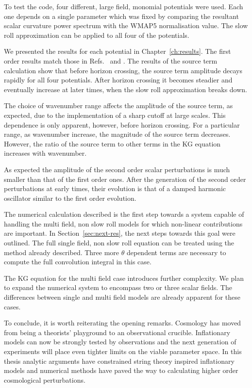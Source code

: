 To test the code, four different, large field, monomial potentials were used. Each
one depends on a single parameter which was fixed by comparing the resultant scalar
curvature power spectrum with the WMAP5 normalisation value. The slow roll
approximation can be applied to all four of the potentials.

We presented the results for each potential in Chapter~\ref{ch:results}. The first
order results match those in Refs.~\cite{Martin:2006rs, Ringeval:2007am} and
\cite{Salopek:1988qh}. The results of the source term calculation show that before
horizon crossing, the source term amplitude decays rapidly for all four potentials.
After horizon crossing it becomes steadier and eventually increase at later times,
when the slow roll approximation breaks down.

The choice of wavenumber range affects the amplitude of the source term, as
expected, due to the implementation of a sharp cutoff at large scales. This
dependence is only apparent, however, before horizon crossing. For a particular
range, as wavenumber increase, the magnitude of the source term decreases. However,
the ratio of the source term to other terms in the KG equation increases with
wavenumber. 

As expected the amplitude of the second order scalar perturbations is much smaller
than that of the first order ones. After the generation of the second order
perturbations at early times, their evolution is that of a damped harmonic
oscillator similar to the first order evolution.


The numerical calculation described is the first step towards a system capable of
handling the multi field, non slow roll models for which non-linear contributions
are important. In Section~\ref{sec:next-res}, the next steps towards this goal were
outlined. The full single field, non slow roll equation can be treated using the
method already described. Three more $\theta$ dependent terms are necessary to
compute the full convolution integral in this case. 

The KG equation for the multi field case introduces further complexity. We plan to
expand the numerical system to encompass two or three scalar fields. The differences
between single and multi field models are already apparent for these cases.



To conclude, it is worth reiterating the opening remarks. Cosmology has moved from
being a theorists' playground to an observational crucible. Inflationary models can
now be strongly tested by observations and the next generation of experiments will
place even tighter limits on the viable parameter space. In this thesis analytic
arguments have constrained string theory inspired inflationary models and numerical
methods have paved the way to calculating higher order cosmological perturbations.